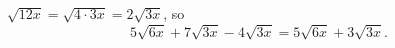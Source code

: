 $\sqrt{12x}=\sqrt{4\cdot3x}=2\sqrt{3x}$, so
\[5\sqrt{6x}+7\sqrt{3x}-4\sqrt{3x}=\boxed{5\sqrt{6x}+3\sqrt{3x}}.\]
